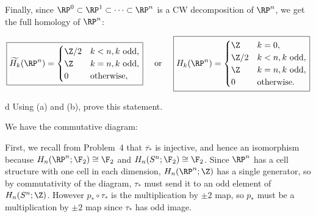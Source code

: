 \documentclass[11pt,letterpaper]{article}
\begin{document}
\begin{solution}
    \quad Finally, since $\RP^0\subset \RP^1\subset \cdots \subset\RP^n$ is a CW decomposition of $\RP^n$, we get the full homology of $\RP^n$:

    \[
        \boxed{\widetilde{H_k}(\RP^n)=\begin{cases}
            \Z/2 & k<n, k\text{ odd},\\
            \Z & k=n, k\text{ odd},\\
            0 & \text{otherwise},
        \end{cases}}
        \quad \text{ or }\quad \boxed{H_k(\RP^n)=\begin{cases}
            \Z & k = 0,\\
            \Z/2 & k<n, k\text{ odd},\\
            \Z & k=n, k\text{ odd},\\
            0 & \text{otherwise}.
        \end{cases}}
    \] 
    \pagebreak
    \begin{partproblem}{d}
        Using (a) and (b), prove this statement.
    \end{partproblem}

    \quad We have the commutative diagram:
    \begin{center}
    \end{center}
    First, we recall from Problem~4 that $\overline{\tau_*}$ is injective, and hence an isomorphism because $H_n(\RP^n; \F_2)\cong \F_2$ and $H_n(S^n;\F_2)\cong \F_2$. Since $\RP^n$ has a cell structure with one cell in each dimension, $H_n(\RP^n; \Z)$ has a single generator, so by commutativity of the diagram, $\tau_*$ must send it to an odd element of $H_n(S^n; \Z)$. However $p_*\circ \tau_*$ is the multiplication by $\pm 2$ map, so $p_*$ must be a multiplication by $\pm 2$ map since $\tau_*$ has odd image.
\end{solution}
\end{document}
